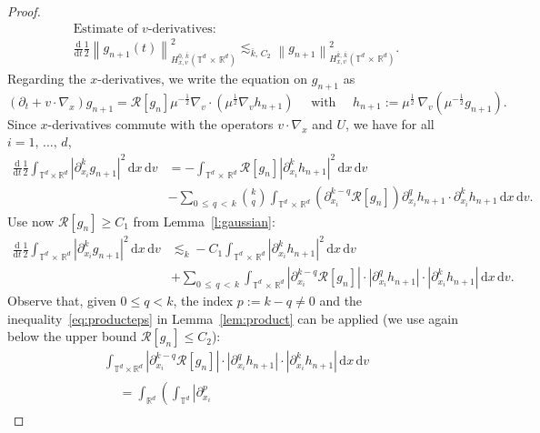 \documentclass[10pt]{amsart}
\theoremstyle{definition}\newtheorem{defi}[theo]{Definition}\newtheorem{rema}[theo]{Remark}\newtheorem{exam}[theo]{Example}\newtheorem{exem}[theo]{Example}\newtheorem{nota}[theo]{Notation}
\newcommand{\R}{\mathbb{R}}
\newcommand{\T}{\mathbb{T}}
\newcommand*\fR{\mathcal{R}}
\newcommand\dt{{\frac{\mathrm d}{\mathrm dt}}}
\newcommand{\dd}{{\, \mathrm d}}
\begin{document}
\begin{proof}
\begin{multline}\label{eq:evol-v}
\text{Estimate of $v$-derivatives}:\\
\dt \frac12 \left\|g_{n+1}(t) \right\|^2_{H^{0,\,\bar k}_{x,v} \left(\T^d\,\times\,\R^d\right)}  \lesssim_{{\bar k},\,C_2}
\left\| g_{n+1} \right\|_{H^{\bar k,\,\bar k}_{x,v}\left(\T^d\,\times\,\R^d\right)} ^2.
\end{multline}
Regarding the $x$-derivatives, we write the equation on $g_{n+1}$ as
\[
(\partial_t + v \cdot \nabla_x) g_{n+1} = \fR [g_n] \mu^{-\frac12}
\nabla_v \cdot \left(\mu^{\frac12} \nabla_v h_{n+1} \right) \quad
\text{ with } \quad h_{n+1}:= \mu^{\frac12} \,\nabla_v \left(\mu^{-\frac12} g_{n+1}\right).
\]
Since $x$-derivatives commute with the operators $v\cdot
\nabla_x$ and $U$, we have for all\linebreak$i=1,\,\dots,\,d$,
\begin{align*}
\dt \frac12 \int_{\T^d \times \R^d} \left|\partial^{k}_{x_i} g_{n+1}\right|^2 \dd x \dd v &=  - \int_{\T^d\, \times\,\R^d} \fR[g_n] \left| \partial_{x_i}^k h_{n+1}\right|^2 \dd x \dd v\\
& -\!\! \sum_{0\,\le\,q\,<\,k} \binom{k}{q} \int_{\T^d\,\times \,\R^d} \left(\partial^{k - q}_{x_i} \fR[g_n]\right) \partial^{q}_{x_i} h_{n+1} \cdot \partial^{k}_{x_i} h_{n+1} \dd x \dd v.
\end{align*}
Use now $\fR[g_n] \ge C_1$ from Lemma~\ref{l:gaussian}:
\begin{align*}
\dt \frac12 \int_{\T^d\,\times\,\R^d} \left|\partial^{k}_{x_i} g_{n+1}\right|^2
\dd x \dd v &\lesssim_k  - C_1 \int_{\T^d\,\times\,\R^d} \left| \partial_{x_i}^{k}h_{n+1}\right|^2 \dd x \dd v \\
& +\!\! \sum_{0\,\le\,q\,<\,k} \int_{\T^d\,\times\,\R^d} \left|\partial^{k - q} _{x_i}
\fR[g_n]\right|\! \cdot\!\left|\partial_{x_i}^{q} h_{n+1}\right|\!
\cdot\!\left|\partial_{x_i}^{k} h_{n+1}\right| \dd x \dd v.
\end{align*}
Observe that, given $0 \le q < k$, the index $p:=k-q \not =0$ and the inequality~\eqref{eq:producteps} in Lemma~\ref{lem:product} can be applied (we use again below the upper bound $\fR[g_n] \le C_2$):
\begin{multline*}
\int_{\T^d \times \R^d} \left|\partial^{k-q} _{x_i}
\fR[g_n]\right|
\cdot \left|\partial_{x_i}^{q} h_{n+1}\right| \cdot \left|\partial_{x_i}^{k} h_{n+1}\right| \dd x \dd v \\
\begin{aligned}
& = \int_{\R^d} \left(\int_{\T^d} \left|\partial^{p} _{x_i}

\end{aligned}
\end{multline*}
\end{proof}
\end{document}
